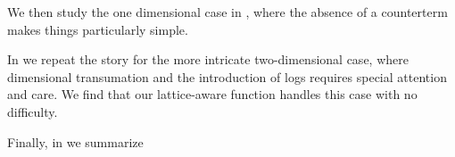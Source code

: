 We then study the one dimensional case in , where the absence of a counterterm makes things particularly simple.

In  we repeat the story for the more intricate two-dimensional case, where dimensional transumation and the introduction of logs requires special attention and care.
We find that our lattice-aware \Luscher function handles this case with no difficulty.

Finally, in  we summarize 

